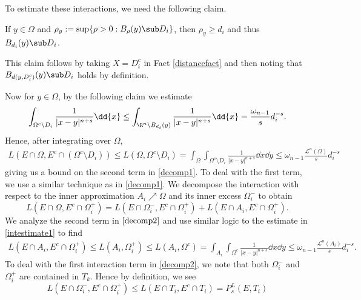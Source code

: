 \documentclass[../main.tex]{subfiles}
\begin{document}

To estimate these interactions, we need the following claim. %
\begin{claim}
    If $ y\in \Omega $ and $ \rho_{y}:= \sup\{\rho>0: B_{\rho}(y)\sub D_{i}\} $, then $ \rho_{y}\geq d_{i} $ and thus $ B_{d_{i}}(y)\sub D_{i} $.
\end{claim}
This claim follows by taking $ X=D_{i}^{c} $ in Fact \ref{distancefact} and then noting that $ B_{d(y,D_{i}^{c})}(y)\sub D_{i} $ holds by definition.

Now for $ y\in \Omega $, by the following claim we estimate
\begin{equation}\label{intestimate1}
    \int_{\Omega^{c}\setminus D_{i}} \frac{1}{|x-y|^{n+s}}\dd{x} \leq \int_{\R^{n}\setminus B_{d_{i}}(y)}\frac{1}{|x-y|^{n+s}}\dd{x} = \frac{\omega_{n-1}}{s} d_{i}^{-s} .
\end{equation}
Hence, after integrating over $ \Omega $,
\begin{align}\label{energyest1}
    L(E\cap \Omega, E^{c}\cap (\Omega^{c}\setminus D_{i})) \leq L(\Omega, \Omega^{c}\setminus D_{i}) = \int_{\Omega}\int_{\Omega^{c}\setminus D_{i}} \frac{1}{|x-y|^{n+s}}\dd{x}\dd{y} \leq \omega_{n-1}\frac{\mathcal{L}^{n}(\Omega)}{s}d_{i}^{-s} 
\end{align}
giving us a bound on the second term in \ref{decomp1}. To deal with the first term, we use a similar technique as in \ref{decomp1}.  We decompose the interaction with respect to the inner approximation $ A_{i}\nearrow \Omega $ and its inner excess $ \Omega_{i}^{-} $ to obtain
\begin{equation}\label{decomp2}
    L(E\cap \Omega, E^{c}\cap \Omega_{i}^{+}) =  L(E\cap \Omega_{i}^{-}, E^{c}\cap \Omega_{i}^{+}) + L(E\cap A_{i}, E^{c}\cap \Omega_{i}^{+}).
\end{equation}
We analyze the second term in $ \ref{decomp2} $ and use similar logic to the estimate in \ref{intestimate1} to find
\begin{align}\label{energyest2}
    L(E\cap A_{i}, E^{c}\cap \Omega_{i}^{+}) \leq L(A_{i}, \Omega_{i}^{+}) \leq L(A_{i}, \Omega^{c}) = \int_{A_{i}}\int_{\Omega^{c}}\frac{1}{|x-y|^{n+s}}\dd{x}\dd{y} \leq \omega_{n-1}\frac{\mathcal{L}^{n}(A_{i})}{s} d_{i}^{-s}.
\end{align}
To deal with the first interaction term in \ref{decomp2}, we note that both $ \Omega_{i}^{-} $ and $ \Omega_{i}^{+} $ are contained in $ T_{k} $. Hence by definition, we see
\begin{equation}\label{symmetricest}
    L(E\cap \Omega_{i}^{-}, E^{c}\cap \Omega_{i}^{+}) \leq L(E\cap T_{i}, E^{c}\cap T_{i}) = P_{s}^{L}(E, T_{i})
\end{equation}
\end{document}
